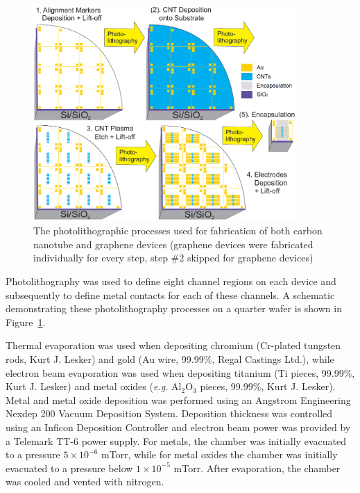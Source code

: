\documentclass[
  a4paper,
]{scrbook}
\begin{document}
\begin{figure}

{\centering \includegraphics[width=0.9\textwidth,height=\textheight]{./figures/ch4/photolithography-cycle.png}

}

\caption{\label{fig-qw-photolithography}The photolithographic processes
used for fabrication of both carbon nanotube and graphene devices
(graphene devices were fabricated individually for every step, step \#2
skipped for graphene devices)}

\end{figure}

Photolithography was used to define eight channel regions on each device
and subsequently to define metal contacts for each of these channels. A
schematic demonstrating these photolithography processes on a quarter
wafer is shown in Figure~\ref{fig-qw-photolithography}.

Thermal evaporation was used when depositing chromium (Cr-plated
tungsten rods, Kurt J. Lesker) and gold (Au wire, 99.99\%, Regal
Castings Ltd.), while electron beam evaporation was used when depositing
titanium (Ti pieces, 99.99\%, Kurt J. Lesker) and metal oxides
(\emph{e.g.} Al\(_2\)O\(_3\) pieces, 99.99\%, Kurt J. Lesker). Metal and
metal oxide deposition was performed using an Angstrom Engineering
Nexdep 200 Vacuum Deposition System. Deposition thickness was controlled
using an Inficon Deposition Controller and electron beam power was
provided by a Telemark TT-6 power supply. For metals, the chamber was
initially evacuated to a pressure \(5 \times 10^{-6}\) mTorr, while for
metal oxides the chamber was initially evacuated to a pressure below
\(1 \times 10^{-5}\) mTorr. After evaporation, the chamber was cooled
and vented with nitrogen.
\end{document}

